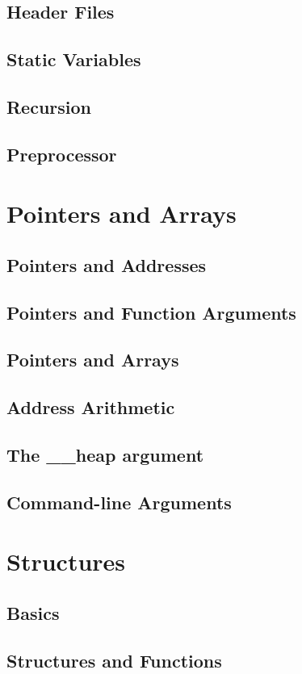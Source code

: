 \documentclass{scrartcl}
\begin{document}
        \subsection{Header Files}
        \subsection{Static Variables}
        \subsection{Recursion}
        \subsection{Preprocessor}
    \section{Pointers and Arrays}
        \subsection{Pointers and Addresses}
        \subsection{Pointers and Function Arguments}
        \subsection{Pointers and Arrays}
        \subsection{Address Arithmetic}
        \subsection{The \_\_heap argument}
        \subsection{Command-line Arguments}
    \section{Structures}
        \subsection{Basics}
        \subsection{Structures and Functions}
\end{document}
